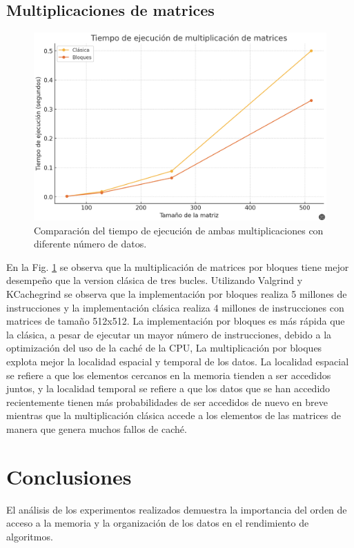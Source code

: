 \documentclass[conference]{IEEEtran}
\begin{document}
\subsection{Multiplicaciones de matrices}
\begin{figure}
  \centering
  \includegraphics[width=\columnwidth]{figures/matrices.png}
  \caption{Comparación del tiempo de ejecución de ambas multiplicaciones con diferente número de datos.}
  \label{fig:matrices}
\end{figure}
En la Fig. \ref{fig:matrices} se observa que la multiplicación de matrices por bloques tiene mejor desempeño que la version clásica de tres bucles. Utilizando Valgrind y KCachegrind se observa que la implementación por bloques realiza 5 millones de instrucciones y la implementación clásica realiza 4 millones de instrucciones con matrices de tamaño 512x512. La implementación por bloques es más rápida que la clásica, a pesar de ejecutar un mayor número de instrucciones, debido a la optimización del uso de la caché de la CPU, La multiplicación por bloques explota mejor la localidad espacial y temporal de los datos. La localidad espacial se refiere a que los elementos cercanos en la memoria tienden a ser accedidos juntos, y la localidad temporal se refiere a que los datos que se han accedido recientemente tienen más probabilidades de ser accedidos de nuevo en breve mientras que la multiplicación clásica accede a los elementos de las matrices de manera que genera muchos fallos de caché.\cite{pacheco2011introduction}
\section{Conclusiones}\label{sec:conc}
El análisis de los experimentos realizados demuestra la importancia del orden de acceso a la memoria y la organización de los datos en el rendimiento de algoritmos.
\end{document}
